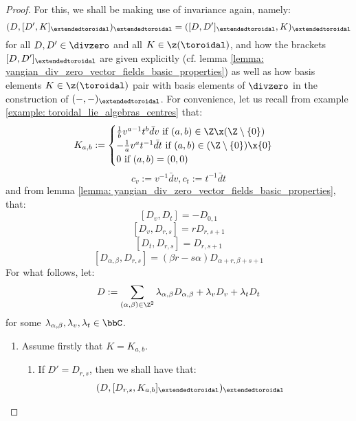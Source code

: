             \begin{proof}
                For this, we shall be making use of invariance again, namely:
                    $$(D, [D', K]_{\extendedtoroidal})_{\extendedtoroidal} = ([D, D']_{\extendedtoroidal}, K)_{\extendedtoroidal}$$
                for all $D, D' \in \divzero$ and all $K \in \z(\toroidal)$, and how the brackets $[D, D']_{\extendedtoroidal}$ are given explicitly (cf. lemma \ref{lemma: yangian_div_zero_vector_fields_basic_properties}) as well as how basis elements $K \in \z(\toroidal)$ pair with basis elements of $\divzero$ in the construction of $(-, -)_{\extendedtoroidal}$. For convenience, let us recall from example \ref{example: toroidal_lie_algebras_centres} that:
                    $$
                        K_{a, b} :=
                        \begin{cases}
                            \text{$\frac1b v^{a - 1} t^b \bar{d}v$ if $(a, b) \in \Z \x (\Z \setminus \{0\})$}
                            \\
                            \text{$-\frac1a v^a t^{-1} \bar{d}t$ if $(a, b) \in (\Z \setminus \{0\}) \x \{0\}$}
                            \\
                            \text{$0$ if $(a, b) = (0, 0)$}
                        \end{cases}
                    $$
                    $$c_v := v^{-1} \bar{d}v, c_t := t^{-1} \bar{d}t$$
                and from lemma \ref{lemma: yangian_div_zero_vector_fields_basic_properties}, that:
                    $$[D_v, D_t] = -D_{0, 1}$$
                    $$[D_v, D_{r, s}] = r D_{r, s + 1}$$
                    $$[D_t, D_{r, s}] = D_{r, s + 1}$$
                    $$[D_{\alpha, \beta}, D_{r, s}] = (\beta r - s \alpha) D_{\alpha + r, \beta + s + 1}$$
                For what follows, let:
                    $$D := \sum_{(\alpha, \beta) \in \Z^2} \lambda_{\alpha, \beta} D_{\alpha, \beta} + \lambda_v D_v + \lambda_t D_t$$
                for some $\lambda_{\alpha, \beta}, \lambda_v, \lambda_t \in \bbC$.
                \begin{enumerate}
                    \item Assume firstly that $K = K_{a, b}$.
                    \begin{enumerate}
                        \item If $D' = D_{r, s}$, then we shall have that:
                            $$
                                \begin{aligned}
                                    & ( D, [D_{r, s}, K_{a, b}]_{\extendedtoroidal} )_{\extendedtoroidal}

\end{aligned}$$
\end{enumerate}
\end{enumerate}
\end{proof}

